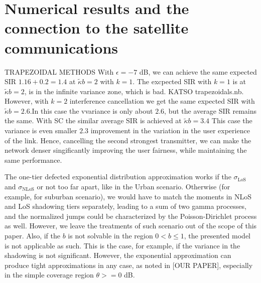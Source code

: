 \documentclass[conference]{IEEEtran}
\theoremstyle{definition}
\theoremstyle{plain}
\begin{document}
          \section{Numerical results and the connection to the satellite communications}
TRAPEZOIDAL METHODS
          With $\epsilon = -7$ dB, we can achieve the same expected SIR $1.16+0.2=1.4$ at $\tilde{\kappa} b= 2$ with $k=1$.  The excpected SIR with $k=1$ is at $\tilde{\kappa} b = 2$, is in the infinite variance zone, which is bad. KATSO trapezoidals.nb. However, with $k=2$ interference cancellation we get the same expected SIR with $\tilde{\kappa}b =2.6$.In this case the vvariance is  only about $2.6$, but the average SIR remains the same. With SC the similar average SIR is achieved at $\tilde{\kappa}b = 3.4$ This case the variance is even smaller $2.3$ improvement in the variation in the user experience of the link.  Hence, cancelling the second strongest transmitter, we can make the network denser singificantly improving the user fairness, while maintaining the same performance. 
          
          
The one-tier defected exponential distribution approximation works if the $\sigma_{\text{LoS}}$ and $\sigma_{\text{NLoS}}$ or not too far apart, like in the Urban scenario. Otherwise (for example, for suburban scenario), we would have to match the moments in NLoS and LoS shadowing tiers separately, leading to a sum of two gamma processes, and the normalized jumps could be characterized by the Poisson-Dirichlet process as well. However, we leave the treatments of such scenario out of the scope of this paper. Also, if the $b$ is not solvable in the region $0<b\leq 1$, the presented model is not applicable as such. This is the case, for example, if the variance in the shadowing is not significant. However, the exponential approximation can produce tight approximations in any case, as noted in [OUR PAPER], especially in the simple coverage region $\theta >=0$ dB.
          

          
         
         
             
             
\end{document}
